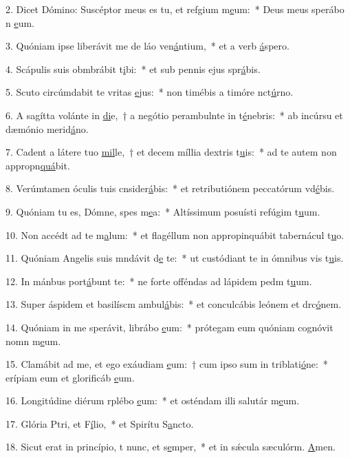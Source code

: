 2. Dicet Dómino: Suscéptor meus es tu, et refgium m\uline{e}um:~* Deus meus sperábo n \uline{e}um.\par 
3. Quóniam ipse liberávit me de láo ven\uline{á}ntium,~* et a verb \uline{á}spero.\par 
4. Scápulis suis obmbrábit t\uline{i}bi:~* et sub pennis ejus spr\uline{á}bis.\par 
5. Scuto circúmdabit te vritas \uline{e}jus:~* non timébis a timóre nct\uline{ú}rno.\par 
6. A sagítta volánte in \uline{di}e,~† a negótio perambulnte in t\uline{é}nebris:~* ab incúrsu et dæmónio merid\uline{á}no.\par 
7. Cadent a látere tuo \uline{mil}le,~† et decem míllia  dextris t\uline{u}is:~* ad te autem non appropn\uline{quá}bit.\par 
8. Verúmtamen óculis tuis cnsider\uline{á}bis:~* et retributiónem peccatórum vd\uline{é}bis.\par 
9. Quóniam tu es, Dómne, spes m\uline{e}a:~* Altíssimum posuísti refúgim t\uline{u}um.\par 
10. Non accédt ad te m\uline{a}lum:~* et flagéllum non appropinquábit tabernácul t\uline{u}o.\par 
11. Quóniam Angelis suis mndávit d\uline{e} te:~* ut custódiant te in ómnibus vis t\uline{u}is.\par 
12. In mánbus port\uline{á}bunt te:~* ne forte offéndas ad lápidem pedm t\uline{u}um.\par 
13. Super áspidem et basilíscm ambul\uline{á}bis:~* et conculcábis leónem et drc\uline{ó}nem.\par 
14. Quóniam in me sperávit, librábo \uline{e}um:~* prótegam eum quóniam cognóvit nomn m\uline{e}um.\par 
15. Clamábit ad me, et ego exáudiam \uline{e}um:~† cum ipso sum in triblati\uline{ó}ne:~* erípiam eum et glorificáb \uline{e}um.\par 
16. Longitúdine diérum rplébo \uline{e}um:~* et osténdam illi salutár m\uline{e}um.\par 
17. Glória Ptri, et F\uline{í}lio,~* et Spirítu S\uline{a}ncto.\par 
18. Sicut erat in princípio, t nunc, et s\uline{e}mper,~* et in sǽcula sæculórm. \uline{A}men.\par 

